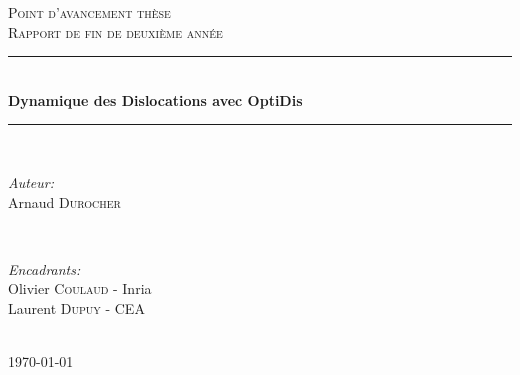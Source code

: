 \begin{titlepage}

\newcommand{\HRule}{\rule{\linewidth}{0.5mm}} %

\center %

\textsc{\LARGE Point d'avancement thèse}\\[1.5cm] %
\textsc{\Large Rapport de fin de deuxième année}\\[0.5cm] %

\HRule \\[0.4cm]
{ \huge \bfseries Dynamique des Dislocations avec OptiDis}\\[0.4cm] %
\HRule \\[1.5cm]

\begin{minipage}{0.4\textwidth}
\begin{flushleft} \large
\emph{Auteur:}\\
Arnaud \textsc{Durocher} %
\end{flushleft}
\end{minipage}
~
\begin{minipage}{0.4\textwidth}
\begin{flushright} \large
\emph{Encadrants:} \\
Olivier \textsc{Coulaud} - Inria\\
Laurent \textsc{Dupuy} - CEA
\end{flushright} 
\end{minipage}\\[2cm]

{\large \today}\\[2cm] %

\vfill %

\end{titlepage}